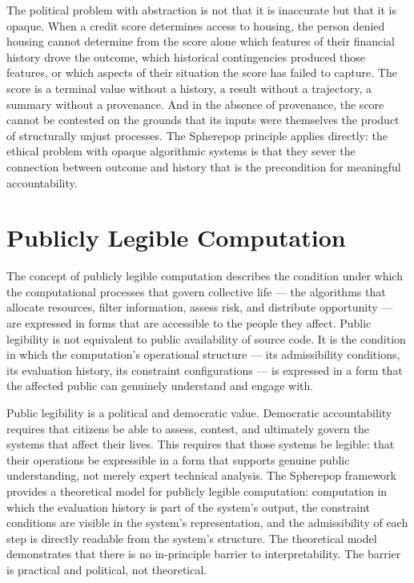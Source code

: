 \documentclass[12pt,openany]{book}
\theoremstyle{plain}
\theoremstyle{definition}
\theoremstyle{remark}
\begin{document}
The political problem with abstraction is not that it is inaccurate but that it is opaque. When a credit score determines access to housing, the person denied housing cannot determine from the score alone which features of their financial history drove the outcome, which historical contingencies produced those features, or which aspects of their situation the score has failed to capture. The score is a terminal value without a history, a result without a trajectory, a summary without a provenance. And in the absence of provenance, the score cannot be contested on the grounds that its inputs were themselves the product of structurally unjust processes. The Spherepop principle applies directly: the ethical problem with opaque algorithmic systems is that they sever the connection between outcome and history that is the precondition for meaningful accountability.

\section{Publicly Legible Computation}

The concept of publicly legible computation describes the condition under which the computational processes that govern collective life — the algorithms that allocate resources, filter information, assess risk, and distribute opportunity — are expressed in forms that are accessible to the people they affect. Public legibility is not equivalent to public availability of source code. It is the condition in which the computation's operational structure — its admissibility conditions, its evaluation history, its constraint configurations — is expressed in a form that the affected public can genuinely understand and engage with.

Public legibility is a political and democratic value. Democratic accountability requires that citizens be able to assess, contest, and ultimately govern the systems that affect their lives. This requires that those systems be legible: that their operations be expressible in a form that supports genuine public understanding, not merely expert technical analysis. The Spherepop framework provides a theoretical model for publicly legible computation: computation in which the evaluation history is part of the system's output, the constraint conditions are visible in the system's representation, and the admissibility of each step is directly readable from the system's structure. The theoretical model demonstrates that there is no in-principle barrier to interpretability. The barrier is practical and political, not theoretical.
\end{document}
